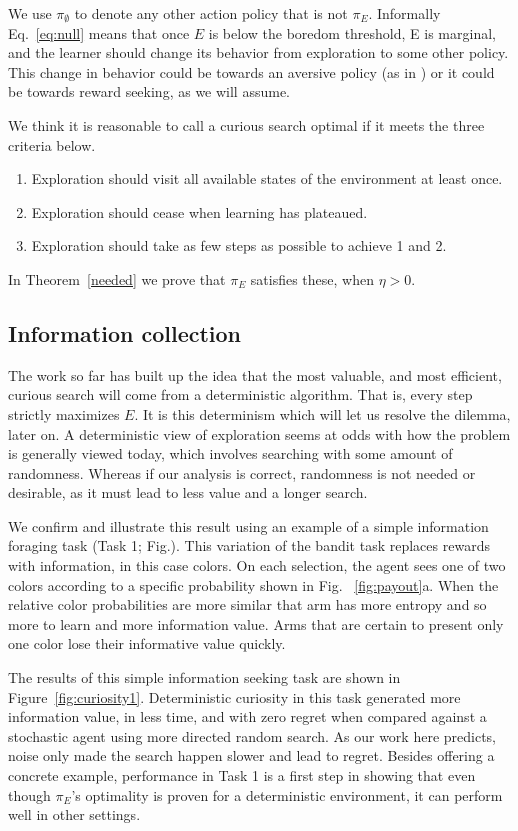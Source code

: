 We use $\pi_{\emptyset}$ to denote any other action policy that is not $\pi_E$. Informally Eq.~\ref{eq:null} means that once $E$ is below the boredom threshold, E is marginal, and the learner should change its behavior from exploration to some other policy. This change in behavior could be towards an aversive policy (as in \citep{Bench2013}) or it could be towards reward seeking, as we will assume.

We think it is reasonable to call a curious search optimal if it meets the three criteria below. 

\begin{enumerate}
	\item Exploration should visit all available states of the environment at least once.
	\item Exploration should cease when learning has plateaued.
	\item Exploration should take as few steps as possible to achieve 1 and 2.
\end{enumerate}

In Theorem~\ref{needed} we prove that $\pi_E$ satisfies these, when $\eta > 0$.

\subsection{Information collection}
The work so far has built up the idea that the most valuable, and most efficient, curious search will come from a deterministic algorithm. That is, every step strictly maximizes $E$. It is this determinism which will let us resolve the dilemma, later on. A deterministic view of exploration seems at odds with how the problem is generally viewed today, which involves searching with some amount of randomness. Whereas if our analysis is correct, randomness is not needed or desirable, as it must lead to less value and a longer search. 

We confirm and illustrate this result using an example of a simple information foraging task (Task 1; Fig.\label{fig:task_outline1}). This variation of the bandit task \citep{Sutton2018} replaces rewards with information, in this case colors. On each selection, the agent sees one of two colors according to a specific probability shown in Fig. ~\ref{fig:payout}a. When the relative color probabilities are more similar that arm has more entropy and so more to learn and more information value. Arms that are certain to present only one color lose their informative value quickly.

The results of this simple information seeking task are shown in Figure~\ref{fig:curiosity1}. Deterministic curiosity in this task generated more information value, in less time, and with zero regret when compared against a stochastic agent using more directed random search. As our work here predicts, noise only made the search happen slower and lead to regret. Besides offering a concrete example, performance in Task 1 is a first step in showing that even though $\pi_E$'s optimality is proven for a deterministic environment, it can perform well in other settings.

